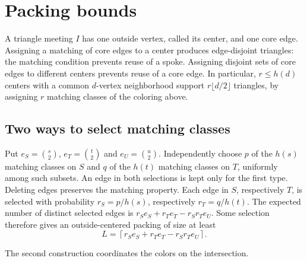 \documentclass[11pt]{article}
\begin{document}
\section{Packing bounds}\label{sec:packing}
A triangle meeting $I$ has one outside vertex, called its center, and
one core edge. Assigning a matching of core edges to a center produces
edge-disjoint triangles: the matching condition prevents reuse of a
spoke. Assigning disjoint sets of core edges to different centers
prevents reuse of a core edge. In particular, $r\leq h(d)$ centers
with a common $d$-vertex neighborhood support $r\lfloor d/2\rfloor$
triangles, by assigning $r$ matching classes of the coloring above.

\subsection{Two ways to select matching classes}
Put $e_S=\binom{s}{2}$, $e_T=\binom{t}{2}$ and $e_U=\binom{u}{2}$.
Independently choose $p$ of the $h(s)$ matching classes on $S$ and
$q$ of the $h(t)$ matching classes on $T$, uniformly among such subsets.
An edge in both selections is kept only for the first type. Deleting
edges preserves the matching property. Each edge in $S$, respectively
$T$, is selected with probability $r_S=p/h(s)$, respectively
$r_T=q/h(t)$. The expected number of distinct selected edges is
$r_Se_S+r_Te_T-r_Sr_Te_U$. Some selection therefore gives an
outside-centered packing of size at least
\begin{equation}\label{eq:allocation-bound}
 L=\left\lceil r_Se_S+r_Te_T-r_Sr_Te_U\right\rceil.
\end{equation}

The second construction coordinates the colors on the intersection.
\end{document}
